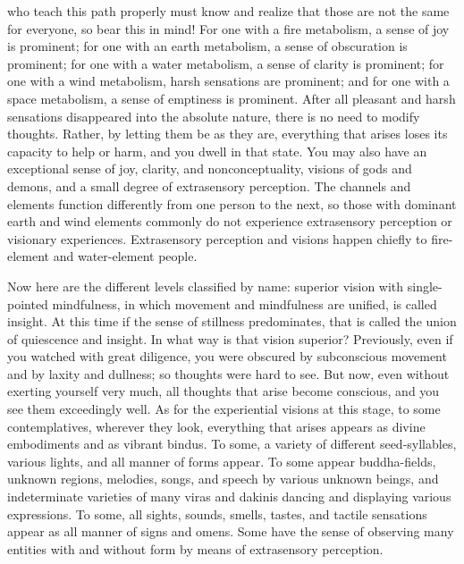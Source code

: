 \documentclass[a4paper,11pt,twoside,final]{book}
\begin{document}
who teach this path properly must know and realize that those are not
the same for everyone, so bear this in mind!  For one with a fire
metabolism, a sense of joy is prominent; for one with an earth
metabolism, a sense of obscuration is prominent; for one with a water
metabolism, a sense of clarity is prominent; for one with a wind
metabolism, harsh sensations are prominent; and for one with a space
metabolism, a sense of emptiness is prominent. After all pleasant and
harsh sensations disappeared into the absolute nature, there is no
need to modify thoughts. Rather, by letting them be as they are,
everything that arises loses its capacity to help or harm, and you
dwell in that state. You may also have an exceptional sense of joy,
clarity, and nonconceptuality, visions of gods and demons, and a small
degree of extrasensory perception. The channels and elements function
differently from one person to the next, so those with dominant earth
and wind elements commonly do not experience extrasensory perception
or visionary experiences. Extrasensory perception and visions happen
chiefly to fire-element and water-element people.

Now here are the different levels classified by name: superior vision
with single-pointed mindfulness, in which movement and mindfulness are
unified, is called insight. At this time if the sense of stillness
predominates, that is called the union of quiescence and insight. In
what way is that vision superior? Previously, even if you watched with
great diligence, you were obscured by subconscious movement and by
laxity and dullness; so thoughts were hard to see. But now, even
without exerting yourself very much, all thoughts that arise become
conscious, and you see them exceedingly well. As for the experiential
visions at this stage, to some contemplatives, wherever they look,
everything that arises appears as divine embodiments and as vibrant
bindus. To some, a variety of different seed-syllables, various
lights, and all manner of forms appear. To some appear buddha-fields,
unknown regions, melodies, songs, and speech by various unknown
beings, and indeterminate varieties of many viras and dakinis dancing
and displaying various expressions. To some, all sights, sounds,
smells, tastes, and tactile sensations appear as all manner of signs
and omens. Some have the sense of observing many entities with and
without form by means of extrasensory perception.
\end{document}
